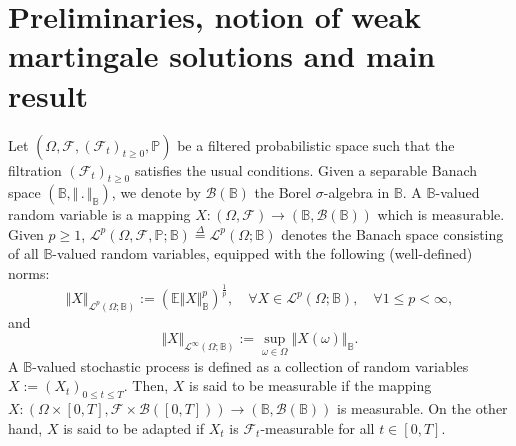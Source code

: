 \documentclass[10pt,number,preprint,times]{elsarticle}
\numberwithin{equation}{section} %
\begin{document}
\section{Preliminaries, notion of weak martingale solutions and main result}\label{section2}
Let $\left(\Omega,\mathcal{F},\left(\mathcal{F}_t\right)_{t \geq0},\mathbb{P}\right)$  be a filtered probabilistic space such that the filtration $\left(\mathcal{F}_t\right)_{t \geq0}$ satisfies the usual conditions. Given a separable Banach space $\left(\mathbb{B}, \Vert \,.\, \Vert_{\mathbb{B}}\right)$, we denote by $\mathcal{B}(\mathbb{B})$ the Borel $\sigma$-algebra in $\mathbb{B}$. A $\mathbb{B}$-valued random variable is a mapping $ X : \left(\Omega,\mathcal{F}\right) \longrightarrow \left(\mathbb{B},\mathcal{B}(\mathbb{B})\right)$ which is measurable. Given $p \geq 1$, $\mathcal{L}^p\left(\Omega,\mathcal{F},\mathbb{P};\mathbb{B}\right)\overset{\Delta}{=}\mathcal{L}^p\left(\Omega;\mathbb{B}\right)$ denotes the Banach space consisting of all $\mathbb{B}$-valued random variables, equipped with the following (well-defined) norms:
$$
\Vert X \Vert_{\mathcal{L}^p\left(\Omega;\mathbb{B}\right)}:=\left(\mathbb{E} \Vert X \Vert_{\mathbb{B}}^p\right)^{\frac{1}{p}}, \quad \forall X \in \mathcal{L}^p\left(\Omega;\mathbb{B}\right), \quad \forall 1 \leq p < \infty,
$$
and
$$
\Vert X \Vert_{\mathcal{L}^\infty\left(\Omega;\mathbb{B}\right)}:=\underset{\omega \in \Omega}{\sup} \Vert X(\omega) \Vert_{\mathbb{B}}.
$$
A $\mathbb{B}$-valued stochastic process is defined as a collection of random variables $X:=\left(X_t\right)_{0 \leq t \leq T}$. Then, $X$ is said to be measurable if the mapping $X : \left(\Omega \times [0,T],\mathcal{F} \times \mathcal{B}([0,T]) \right)  \longrightarrow  \left(\mathbb{B},\mathcal{B}(\mathbb{B})\right)$
is measurable. On the other hand, $X$ is said to be adapted if $X_t$ is $\mathcal{F}_t$-measurable for all $t \in [0,T]$. 
\end{document}
